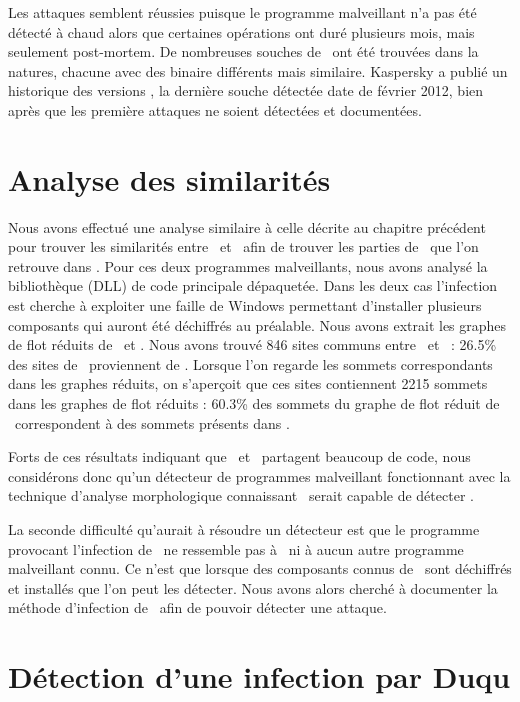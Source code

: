 Les attaques semblent réussies puisque le programme malveillant n'a pas été détecté à chaud alors que certaines opérations ont duré plusieurs mois, mais seulement post-mortem. De nombreuses souches de \duqu\ ont été trouvées dans la natures, chacune avec des binaire différents mais similaire. Kaspersky a publié un historique des versions \cite{KaspDuqu10}, la dernière souche détectée date de février 2012, bien après que les première attaques ne soient détectées et documentées.

\section{Analyse des similarités}
Nous avons effectué une analyse similaire à celle décrite au chapitre précédent pour trouver les similarités entre \stux\ et \duqu\ afin de trouver les parties de \stux\ que l'on retrouve dans \duqu.
Pour ces deux programmes malveillants, nous avons analysé la bibliothèque (DLL) de code principale dépaquetée.
Dans les deux cas l'infection est cherche à exploiter une faille de Windows permettant d'installer plusieurs composants qui auront été déchiffrés au préalable.
Nous avons extrait les graphes de flot réduits de \duqu\ et \stux.
Nous avons trouvé 846 sites communs entre \duqu\ et \stux\ : 26.5\% des sites de \duqu\ proviennent de \stux.
Lorsque l'on regarde les sommets correspondants dans les graphes réduits, on s'aperçoit que ces sites contiennent 2215 sommets dans les graphes de flot réduits : 60.3\% des sommets du graphe de flot réduit de \duqu\ correspondent à des sommets  présents dans \stux.

Forts de ces résultats indiquant que \duqu\ et \stux\ partagent beaucoup de code, nous considérons donc qu'un détecteur de programmes malveillant fonctionnant avec la technique d'analyse morphologique connaissant \stux\ serait capable de détecter \duqu.

La seconde difficulté qu'aurait à résoudre un détecteur est que le programme provocant l'infection de \duqu\ ne ressemble pas à \stux\ ni à aucun autre programme malveillant connu. Ce n'est que lorsque des composants connus de \duqu\ sont déchiffrés et installés que l'on peut les détecter.
Nous avons alors cherché à documenter la méthode d'infection de \duqu\ afin de pouvoir détecter une attaque.

\section{Détection d'une infection par Duqu}
